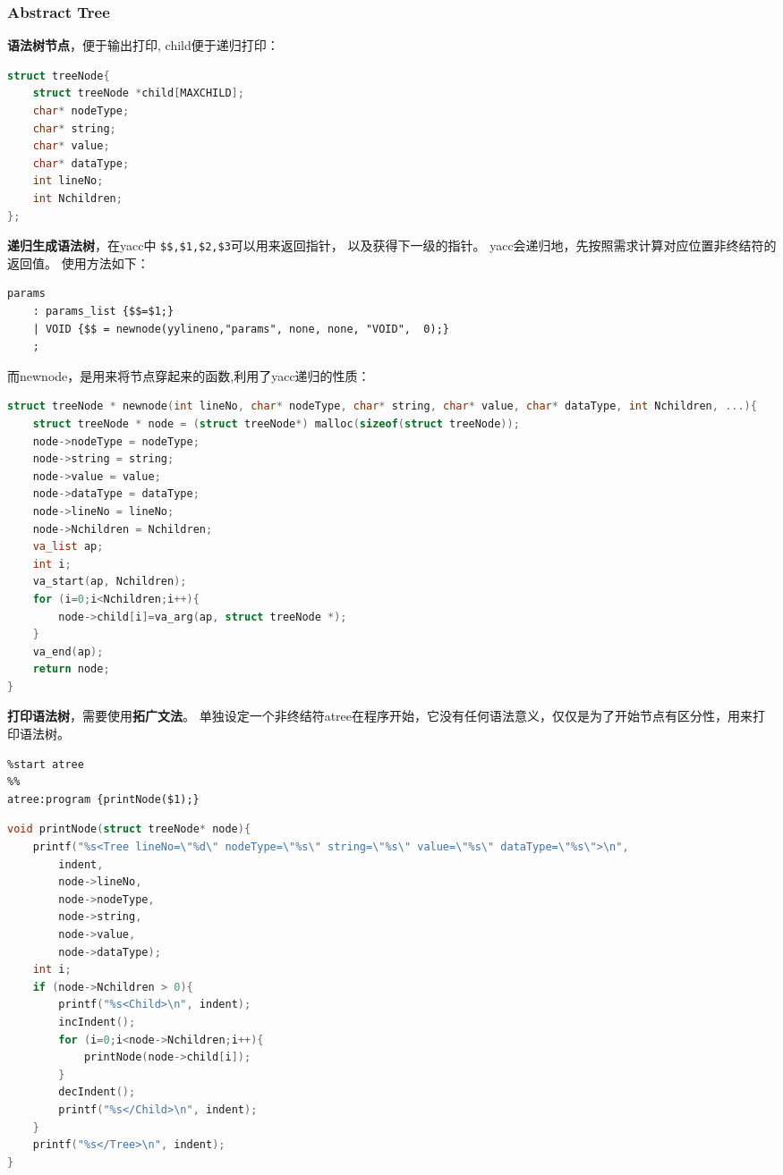 \documentclass{article}
\begin{document}
\begin{CJK}{UTF8}{gkai}
\subsubsection{Abstract Tree}
\textbf{语法树节点}，便于输出打印, child便于递归打印：
\begin{lstlisting}[language=c]
struct treeNode{
    struct treeNode *child[MAXCHILD];
    char* nodeType;
    char* string;
    char* value;
    char* dataType;
    int lineNo;
    int Nchildren;
};
\end{lstlisting}


\textbf{递归生成语法树}，在yacc中 \verb|$$,$1,$2,$3|可以用来返回指针，
以及获得下一级的指针。
yacc会递归地，先按照需求计算对应位置非终结符的返回值。
使用方法如下：
\begin{verbatim}
params
    : params_list {$$=$1;}
    | VOID {$$ = newnode(yylineno,"params", none, none, "VOID",  0);}
    ;
\end{verbatim}

而newnode，是用来将节点穿起来的函数,利用了yacc递归的性质：
\begin{lstlisting}[language=c]
struct treeNode * newnode(int lineNo, char* nodeType, char* string, char* value, char* dataType, int Nchildren, ...){
    struct treeNode * node = (struct treeNode*) malloc(sizeof(struct treeNode));
    node->nodeType = nodeType;
    node->string = string;
    node->value = value;
    node->dataType = dataType;
    node->lineNo = lineNo;
    node->Nchildren = Nchildren;
    va_list ap;
    int i;
    va_start(ap, Nchildren);
    for (i=0;i<Nchildren;i++){
        node->child[i]=va_arg(ap, struct treeNode *);
    }
    va_end(ap);
    return node;
}
\end{lstlisting}

\textbf{打印语法树}，需要使用\textbf{拓广文法}。
单独设定一个非终结符atree在程序开始，它没有任何语法意义，仅仅是为了开始节点有区分性，用来打印语法树。

\begin{verbatim}
%start atree
%%
atree:program {printNode($1);}
\end{verbatim}

\begin{lstlisting}[language=c]
void printNode(struct treeNode* node){
    printf("%s<Tree lineNo=\"%d\" nodeType=\"%s\" string=\"%s\" value=\"%s\" dataType=\"%s\">\n", 
        indent,
        node->lineNo,
        node->nodeType,
        node->string,
        node->value, 
        node->dataType);
    int i;
    if (node->Nchildren > 0){
        printf("%s<Child>\n", indent);
        incIndent();
        for (i=0;i<node->Nchildren;i++){
            printNode(node->child[i]);
        }
        decIndent();
        printf("%s</Child>\n", indent);
    }
    printf("%s</Tree>\n", indent);
}
\end{lstlisting}


\end{CJK}
\end{document}
